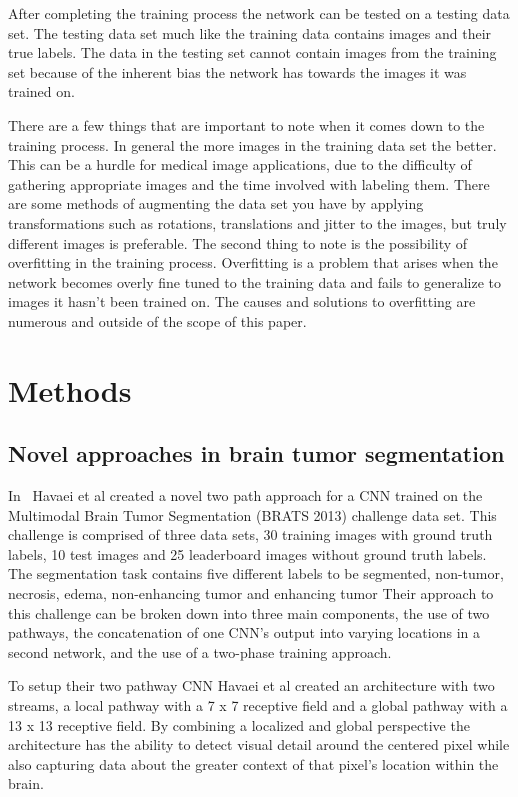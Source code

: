 \documentclass{sig-alternate}
\begin{document}
After completing the training process the network can be tested on a testing data set. The testing data set much like the training data contains images and their true labels. The data in the testing set cannot contain images from the training set because of the inherent bias the network has towards the images it was trained on.

There are a few things that are important to note when it comes down to the training process. In general the more images in the training data set the better. This can be a hurdle for medical image applications, due to the difficulty of gathering appropriate images and the time involved with labeling them. There are some methods of augmenting the data set you have by applying transformations such as rotations, translations and jitter to the images, but truly different images is preferable. The second thing to note is the possibility of overfitting in the training process. Overfitting is a problem that arises when the network becomes overly fine tuned to the training data and fails to generalize to images it hasn't been trained on. The causes and solutions to overfitting are numerous and outside of the scope of this paper.

\section{Methods}
\label{sec:methods}

\subsection{Novel approaches in brain tumor segmentation}
\label{sec:novelBrainTumorApproach}
In~\cite{Havaei:2017} Havaei et al created a novel two path approach for a CNN trained on the Multimodal Brain Tumor Segmentation (BRATS 2013) challenge data set. This challenge is comprised of three data sets, 30 training images with ground truth labels, 10 test images and 25 leaderboard images without ground truth labels. The segmentation task contains five different labels to be segmented, non-tumor, necrosis, edema, non-enhancing tumor and enhancing tumor Their approach to this challenge can be broken down into three main components, the use of two pathways, the concatenation of one CNN's output into varying locations in a second network, and the use of a two-phase training approach.

To setup their two pathway CNN Havaei et al created an architecture with two streams, a local pathway with a 7 x 7 receptive field and a global pathway with a 13 x 13 receptive field. By combining a localized and global perspective the architecture has the ability to detect visual detail around the centered pixel while also capturing data about the greater context of that pixel's location within the brain.
\end{document}
